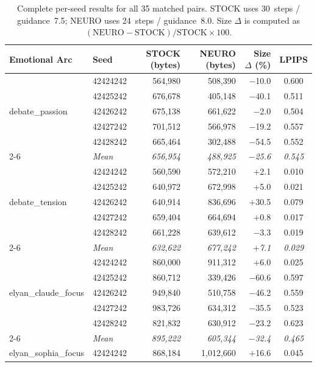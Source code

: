 \documentclass[10pt,twocolumn,letterpaper]{article}
\begin{document}
\begin{table}[t]
\centering
\small
\caption{Complete per-seed results for all 35 matched pairs. STOCK uses 30~steps / guidance~7.5; NEURO uses 24~steps / guidance~8.0. Size $\Delta$ is computed as $(\text{NEURO} - \text{STOCK})/\text{STOCK} \times 100$.}
\label{tab:full_results}
\begin{tabular}{llrrrc}
\toprule
\textbf{Emotional Arc} & \textbf{Seed} & \textbf{STOCK (bytes)} & \textbf{NEURO (bytes)} & \textbf{Size $\Delta$ (\%)} & \textbf{LPIPS} \\
\midrule
\multirow{5}{*}{debate\_passion}
 & 42424242 & 564,980 & 508,390 & $-$10.0 & 0.600 \\
 & 42425242 & 676,678 & 405,148 & $-$40.1 & 0.511 \\
 & 42426242 & 675,138 & 661,622 & $-$2.0 & 0.504 \\
 & 42427242 & 701,512 & 566,978 & $-$19.2 & 0.557 \\
 & 42428242 & 665,464 & 302,488 & $-$54.5 & 0.552 \\
\cmidrule{2-6}
 & \textit{Mean} & \textit{656,954} & \textit{488,925} & \textit{$-$25.6} & \textit{0.545} \\
\midrule
\multirow{5}{*}{debate\_tension}
 & 42424242 & 560,590 & 572,210 & $+$2.1 & 0.010 \\
 & 42425242 & 640,972 & 672,998 & $+$5.0 & 0.021 \\
 & 42426242 & 640,914 & 836,696 & $+$30.5 & 0.079 \\
 & 42427242 & 659,404 & 664,694 & $+$0.8 & 0.017 \\
 & 42428242 & 661,228 & 639,612 & $-$3.3 & 0.019 \\
\cmidrule{2-6}
 & \textit{Mean} & \textit{632,622} & \textit{677,242} & \textit{$+$7.1} & \textit{0.029} \\
\midrule
\multirow{5}{*}{elyan\_claude\_focus}
 & 42424242 & 860,000 & 911,312 & $+$6.0 & 0.025 \\
 & 42425242 & 860,712 & 339,426 & $-$60.6 & 0.597 \\
 & 42426242 & 949,840 & 510,758 & $-$46.2 & 0.559 \\
 & 42427242 & 983,726 & 634,312 & $-$35.5 & 0.523 \\
 & 42428242 & 821,832 & 630,912 & $-$23.2 & 0.623 \\
\cmidrule{2-6}
 & \textit{Mean} & \textit{895,222} & \textit{605,344} & \textit{$-$32.4} & \textit{0.465} \\
\midrule
\multirow{5}{*}{elyan\_sophia\_focus}
 & 42424242 & 868,184 & 1,012,660 & $+$16.6 & 0.045 \\

\end{tabular}
\end{table}
\end{document}

